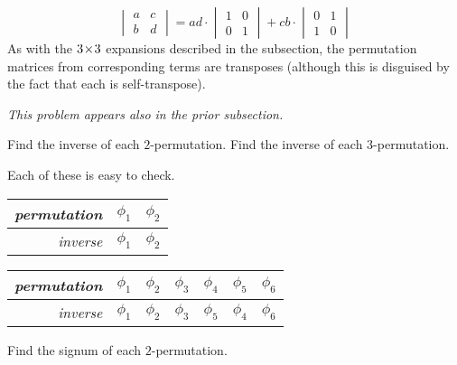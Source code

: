 \begin{exercises}
\begin{answer}
\begin{equation*}
         \begin{vmatrix}
            a  &c  \\
            b  &d
         \end{vmatrix}
         =ad\cdot\begin{vmatrix}
                    1  &0  \\
                    0  &1
                 \end{vmatrix}
         +cb\cdot\begin{vmatrix}
                   0  &1 \\
                   1  &0
                 \end{vmatrix}
       \end{equation*}
       As with the $3 \! \times \! 3$ expansions described in the subsection,
       the permutation matrices from corresponding terms are
       transposes (although this is disguised by the fact that each
       is self-transpose).
    \end{answer}
  \recommended \item 
    \textit{This problem appears also in the prior subsection.}
    \begin{exparts}
      \partsitem Find the inverse of each $2$-permutation.
      \partsitem Find the inverse of each $3$-permutation.
    \end{exparts}
    \begin{answer}
      Each of these is easy to check.
      \begin{exparts*}
        \partsitem 
          \begin{tabular}[t]{r|cc}
            \textit{permutation} &$\phi_1$  &$\phi_2$ \\
             \hline
            \textit{inverse}     &$\phi_1$  &$\phi_2$ 
          \end{tabular}
        \partsitem 
          \begin{tabular}[t]{r|cccccc}
            \textit{permutation} 
              &$\phi_1$ &$\phi_2$ &$\phi_3$ &$\phi_4$ &$\phi_5$ &$\phi_6$ \\
            \hline
            \textit{inverse}
              &$\phi_1$ &$\phi_2$ &$\phi_3$ &$\phi_5$ &$\phi_4$ &$\phi_6$ 
          \end{tabular}
      \end{exparts*}
    \end{answer}
  \recommended \item
    \begin{exparts}
      \partsitem Find the signum of each $2$-permutation.

\end{exparts}
\end{exercises}
